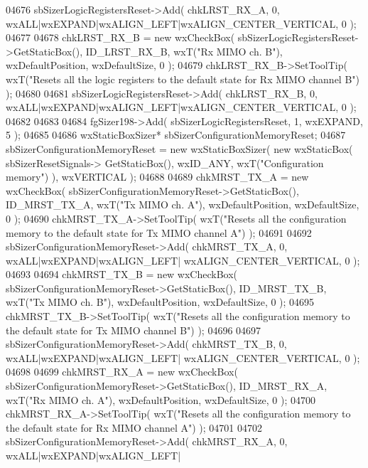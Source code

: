 \begin{DoxyCode}
04676     sbSizerLogicRegistersReset->Add( chkLRST_RX_A, 0, wxALL|wxEXPAND|wxALIGN\_LEFT|wxALIGN\_CENTER\_VERTICAL, 
      0 );
04677     
04678     chkLRST_RX_B = \textcolor{keyword}{new} wxCheckBox( sbSizerLogicRegistersReset->GetStaticBox(), 
      ID_LRST_RX_B, wxT(\textcolor{stringliteral}{"Rx MIMO ch. B"}), wxDefaultPosition, wxDefaultSize, 0 );
04679     chkLRST_RX_B->SetToolTip( wxT(\textcolor{stringliteral}{"Resets all the logic registers to the default state for Rx MIMO channel
       B"}) );
04680     
04681     sbSizerLogicRegistersReset->Add( chkLRST_RX_B, 0, wxALL|wxEXPAND|wxALIGN\_LEFT|wxALIGN\_CENTER\_VERTICAL, 
      0 );
04682     
04683     
04684     fgSizer198->Add( sbSizerLogicRegistersReset, 1, wxEXPAND, 5 );
04685     
04686     wxStaticBoxSizer* sbSizerConfigurationMemoryReset;
04687     sbSizerConfigurationMemoryReset = \textcolor{keyword}{new} wxStaticBoxSizer( \textcolor{keyword}{new} wxStaticBox( sbSizerResetSignals->
      GetStaticBox(), wxID\_ANY, wxT(\textcolor{stringliteral}{"Configuration memory"}) ), wxVERTICAL );
04688     
04689     chkMRST_TX_A = \textcolor{keyword}{new} wxCheckBox( sbSizerConfigurationMemoryReset->GetStaticBox(), 
      ID_MRST_TX_A, wxT(\textcolor{stringliteral}{"Tx MIMO ch. A"}), wxDefaultPosition, wxDefaultSize, 0 );
04690     chkMRST_TX_A->SetToolTip( wxT(\textcolor{stringliteral}{"Resets all the configuration memory to the default state for Tx MIMO
       channel A"}) );
04691     
04692     sbSizerConfigurationMemoryReset->Add( chkMRST_TX_A, 0, wxALL|wxEXPAND|wxALIGN\_LEFT|
      wxALIGN\_CENTER\_VERTICAL, 0 );
04693     
04694     chkMRST_TX_B = \textcolor{keyword}{new} wxCheckBox( sbSizerConfigurationMemoryReset->GetStaticBox(), 
      ID_MRST_TX_B, wxT(\textcolor{stringliteral}{"Tx MIMO ch. B"}), wxDefaultPosition, wxDefaultSize, 0 );
04695     chkMRST_TX_B->SetToolTip( wxT(\textcolor{stringliteral}{"Resets all the configuration memory to the default state for Tx MIMO
       channel B"}) );
04696     
04697     sbSizerConfigurationMemoryReset->Add( chkMRST_TX_B, 0, wxALL|wxEXPAND|wxALIGN\_LEFT|
      wxALIGN\_CENTER\_VERTICAL, 0 );
04698     
04699     chkMRST_RX_A = \textcolor{keyword}{new} wxCheckBox( sbSizerConfigurationMemoryReset->GetStaticBox(), 
      ID_MRST_RX_A, wxT(\textcolor{stringliteral}{"Rx MIMO ch. A"}), wxDefaultPosition, wxDefaultSize, 0 );
04700     chkMRST_RX_A->SetToolTip( wxT(\textcolor{stringliteral}{"Resets all the configuration memory to the default state for Rx MIMO
       channel A"}) );
04701     
04702     sbSizerConfigurationMemoryReset->Add( chkMRST_RX_A, 0, wxALL|wxEXPAND|wxALIGN\_LEFT|

\end{DoxyCode}
